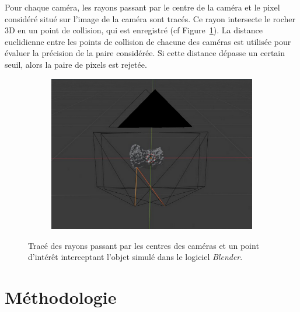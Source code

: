 \documentclass[
	a4paper, %
	10pt, %
	unnumberedsections, %
	twoside, %
]{LTJournalArticle}
\begin{document}
Pour chaque caméra, les rayons passant par le centre de la caméra et le pixel considéré situé sur l'image de la caméra sont tracés. Ce rayon intersecte le rocher 3D en un point de collision, qui est enregistré (cf Figure~\ref{figure:blender_check}).
La distance euclidienne entre les points de collision de chacune des caméras est utilisée pour évaluer la précision de la paire considérée.
Si cette distance dépasse un certain seuil, alors la paire de pixels est rejetée. %

\begin{figure}[H]
	\centering
	\begin{subfigure}[H]{\columnwidth}
		\centering
		\includegraphics[width=\textwidth]{images/blender_check.png}
	\end{subfigure}
	\caption{Tracé des rayons passant par les centres des caméras et un point d'intérêt interceptant l'objet simulé dans le logiciel \textit{Blender}.}
	\label{figure:blender_check}
\end{figure}

\section{Méthodologie}
\end{document}
